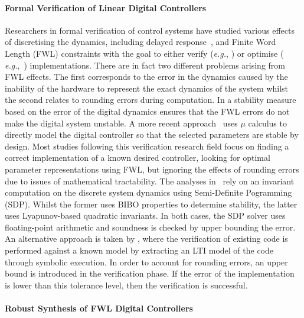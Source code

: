 \documentclass{sig-alternate-05-2015}
\begin{document}
\paragraph{Formal Verification of Linear Digital Controllers} 

Researchers in formal verification of control systems have studied various
effects of discretising the dynamics, including delayed
response~\cite{Duggirala2015}, and Finite Word Length (FWL) constraints with
the goal to either verify ({\it e.g.}, \cite{daes20161}) or optimise ({\it
e.g.},~\cite{oudjida2014design}) implementations.  There are in fact two
different problems arising from FWL effects.  The first corresponds to the
error in the dynamics caused by the inability of the hardware to represent
the exact dynamics of the system whilst the second relates to rounding
errors during computation.  In \cite{fialho1994stability} a stability
measure based on the error of the digital dynamics ensures that the FWL
errors do not make the digital system unstable.  A more recent
approach~\cite{DBLP:journals/automatica/WuLCC09} uses $\mu$ calculus to
directly model the digital controller so that the selected parameters are
stable by design.  Most studies following this verification research field
focus on finding a correct implementation of a known desired controller,
looking for optimal parameter representations using FWL, but ignoring the
effects of rounding errors due to issues of mathematical tractability.  The
analyses in~\cite{DBLP:conf/hybrid/WangGRJF16,DBLP:conf/hybrid/RouxJG15}
rely on an invariant computation on the discrete system dynamics using
Semi-Definite Pogramming (SDP).  Whilst the former uses BIBO properties to
determine stability, the latter uses Lyapunov-based quadratic invariants. 
In both cases, the SDP solver uses floating-point arithmetic and soundness
is checked by upper bounding the error.  An alternative approach is taken by
\cite{park2016scalable}, where the verification of existing code is
performed against a known model by extracting an LTI model of the code
through symbolic execution.  In order to account for rounding errors, an
upper bound is introduced in the verification phase.  If the error of the
implementation is lower than this tolerance level, then the verification is
successful.

\paragraph{Robust Synthesis of FWL Digital Controllers}
\end{document}
